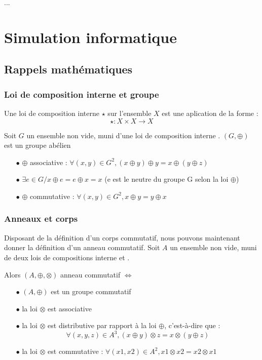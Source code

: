\documentclass[a4paper,12pt]{report}
\newcommand{\para}[1]{\par{#1}\\}
\begin{document}
\para{
...
}

\chapter{Simulation informatique}
	\section{Rappels mathématiques}
		\subsection{Loi de composition interne et groupe}

\par{
Une loi de composition interne $\star{}$ sur l'ensemble $X$ est une aplication de la forme : \[\star : X \times X \rightarrow X\]
}

\par{
	Soit $G$ un ensemble non vide, muni d'une loi de composition interne \oplus. $ (G, \oplus)$ est un groupe abélien \Leftrightarrow
}

\begin{itemize}
\item[$\bullet$] $\oplus$ associative : $\forall (x,y) \in G^2, (x \oplus y) \oplus y = x \oplus ( y \oplus z )$
\item[$\bullet$] $\exists e \in G / x \oplus e = e \oplus x = x$ (e est le neutre du groupe G selon la loi $\oplus$)
\item[$\bullet$] $\oplus$ commutative : $\forall (x,y) \in G^2, x \oplus y = y \oplus x$ \\
\end{itemize}

		\subsection{Anneaux et corps}

\par{
	Disposant de la définition d'un corps commutatif, nous pouvons maintenant donner la définition d'un anneau commutatif. Soit $A$ un ensemble non vide, muni de deux lois de compositions interne \oplus et \otimes.
}

\par{
	Alors $(A, \oplus, \otimes)$ anneau commutatif $\Leftrightarrow$
}

\begin{itemize}
\item[$\bullet$] $ (A, \oplus)$ est un groupe commutatif
\item[$\bullet$] la loi $\otimes$ est associative
\item[$\bullet$] la loi $\otimes$ est distributive par rapport à la loi $\oplus$, c'est-à-dire que : \[ \forall (x,y,z) \in A^3, (x \oplus y) \otimes z = x \otimes ( y \oplus z ) \]
\item[$\bullet$] la loi $\otimes$ est commutative : $\forall (x1,x2) \in A^2, x1 \otimes x2 = x2 \otimes x1$
\end{itemize}
\end{document}
